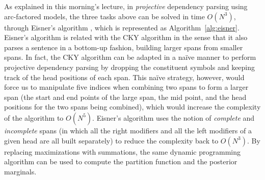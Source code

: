 As explained in this morning's lecture, 
in \emph{projective} dependency parsing using arc-factored models, the three tasks above can be solved in time $O(N^3)$, 
through Eisner's algorithm \citep{Eisner1996}, which is represented 
as Algorithm~\ref{alg:eisner}. 
Eisner's algorithm is related with the CKY algorithm in the sense that it also parses a sentence in a bottom-up 
fashion, building larger spans from smaller spans. 
In fact, the CKY algorithm can be adapted in a na\"ive manner to perform 
projective dependency parsing by dropping the constituent symbols and 
keeping track of the head positions of each span. This na\"ive strategy, however, would force us to 
manipulate five indices when combining two spans to form a larger span (the start and end points of the large span, 
the mid point, and the head positions for the two spans being combined), which would increase the 
complexity of the algorithm to $O(N^5)$. 
Eisner's algorithm uses the notion of \emph{complete} and \emph{incomplete} spans (in which all the right modifiers 
and all the left modifiers of a given head are all built separately) to reduce the complexity back to 
$O(N^3)$.
By replacing maximizations with summations, the same dynamic programming algorithm can be used to compute 
the partition function and the posterior marginals. 

